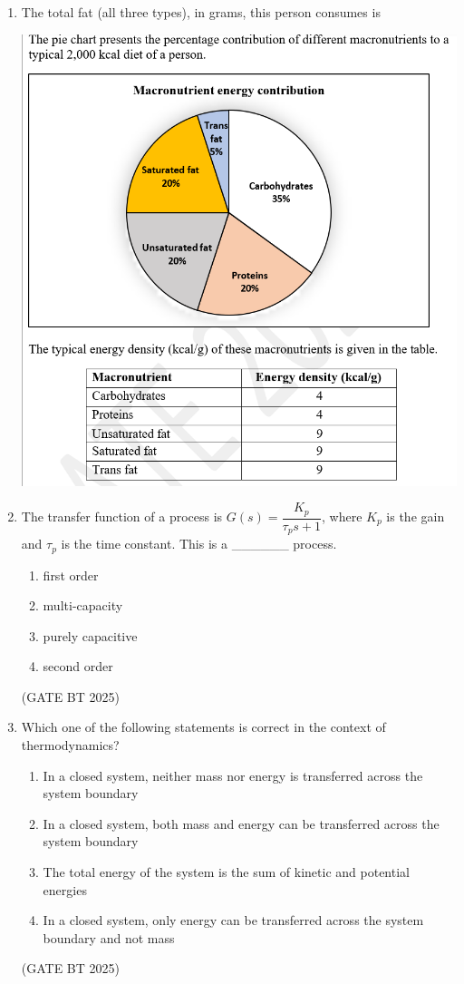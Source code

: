 \documentclass[journal,12pt,onecolumn]{IEEEtran}
\theoremstyle{remark}
\begin{document}
\begin{enumerate}
\item 
The total fat (all three types), in grams, this person consumes is
\begin{center}
\includegraphics[width=\columnwidth]{figs/table.png}
    \label{fig:macronutrient_pie}
\end{center}

\item 
The transfer function of a process is $G(s) = \dfrac{K_p}{\tau_p s + 1}$, where $K_p$ is the gain and $\tau_p$ is the time constant. This is a \_\_\_\_\_\_ process.

\begin{enumerate}
    \item first order
    \item multi-capacity
    \item purely capacitive
    \item second order
\end{enumerate}
\hfill(GATE BT 2025)

\item 
Which one of the following statements is correct in the context of thermodynamics?

\begin{enumerate}
    \item In a closed system, neither mass nor energy is transferred across the system boundary
    \item In a closed system, both mass and energy can be transferred across the system boundary
    \item The total energy of the system is the sum of kinetic and potential energies
    \item In a closed system, only energy can be transferred across the system boundary and not mass
\end{enumerate}
\hfill(GATE BT 2025)


\end{enumerate}
\end{document}
